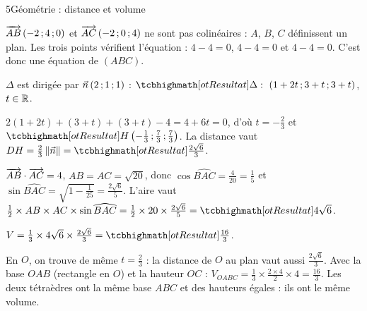 \begin{corrigeBac}{5}{Géométrie : distance et volume}
\begin{questions}
  \item $\overrightarrow{AB}\,(-2\,{;}\,4\,{;}\,0)$ et $\overrightarrow{AC}\,(-2\,{;}\,0\,{;}\,4)$ ne sont pas colinéaires : $A$, $B$, $C$ définissent un plan. Les trois points
    vérifient l'équation : $4-4=0$, $4-4=0$ et $4-4=0$. C'est donc une équation de $(ABC)$. \pts{1 pt}
  \item $\Delta$ est dirigée par $\vec n\,(2\,{;}\,1\,{;}\,1)$ : $\res{\Delta:\ (1+2t\pv3+t\pv3+t)}$, $t\in\mathbb{R}$. 
  \item $2(1+2t)+(3+t)+(3+t)-4=4+6t=0$, d'où $t=-\frac23$ et $\res{H\left(-\tfrac13\pv\tfrac73\pv\tfrac73\right)}$. La distance vaut
    $DH=\frac23\norme{\vec n}=\res{\tfrac{2\sqrt6}{3}}$. \pts{1 pt}
  \item $\overrightarrow{AB}\cdot\overrightarrow{AC}=4$, $AB=AC=\sqrt{20}$, donc $\cos\widehat{BAC}=\frac4{20}=\frac15$ et
    $\sin\widehat{BAC}=\sqrt{1-\frac1{25}}=\frac{2\sqrt6}{5}$. L'aire vaut $\frac12\times AB\times AC\times\sin\widehat{BAC}
    =\frac12\times20\times\frac{2\sqrt6}{5}=\res{4\sqrt6}$. 
  \item $V=\frac13\times4\sqrt6\times\frac{2\sqrt6}{3}=\res{\tfrac{16}{3}}$. 
  \item En $O$, on trouve de même $t=\frac23$ : la distance de $O$ au plan vaut aussi $\frac{2\sqrt6}{3}$. Avec la base $OAB$ (rectangle
    en $O$) et la hauteur $OC$ : $V_{OABC}=\frac13\times\frac{2\times4}{2}\times4=\frac{16}{3}$. Les deux tétraèdres ont la même base
    $ABC$ et des hauteurs égales : ils ont le même volume. 
\end{questions}
\end{corrigeBac}


